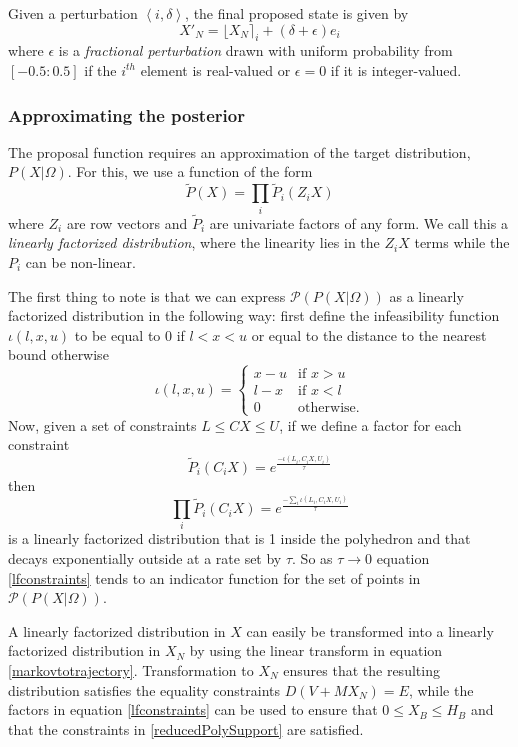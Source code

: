 \documentclass{article}
\begin{document}
Given a perturbation $\left<i,\delta\right>$, the final proposed state is given by
\[
X'_N = \lfloor X_N \rceil_i + (\delta + \epsilon)e_i
\]
where $\epsilon$ is a \textit{fractional perturbation} drawn with uniform probability from $[-0.5:0.5]$ if the $i^{th}$ element is real-valued or $\epsilon = 0$ if it is integer-valued.

\subsubsection{Approximating the posterior}
\label{approximatingThePosterior}
The proposal function requires an approximation of the target distribution, $P(X|\Omega)$. For this, we use a function of the form
\begin{equation}
\tilde{P}(X) = \prod_i \tilde{P}_i(Z_iX)
\end{equation}
where $Z_i$ are row vectors and $\tilde{P}_i$ are univariate factors of any form. We call this a \textit{linearly factorized distribution}, where the linearity lies in the $Z_iX$ terms while the $P_i$ can be non-linear.

The first thing to note is that we can express $\mathcal{P}(P(X|\Omega))$ as a linearly factorized distribution in the following way: first define the infeasibility function $\iota(l,x,u)$ to be equal to 0 if $l < x < u$ or equal to the distance to the nearest bound otherwise
\[
\iota(l,x,u) =
\begin{cases}
x-u & \text{if }x>u\\
l-x & \text{if }x<l\\
0 & \text{otherwise.}
\end{cases}
\]
Now, given a set of constraints $L \le CX \le U$, if we define a factor for each constraint
\begin{equation}
\tilde{P}_i(C_iX) = e^{\frac{-\iota(L_i,C_iX,U_i)}{\tau}}
\end{equation}
then
\begin{equation}
\prod_i \tilde{P}_i(C_iX) = e^{\frac{-\sum_i \iota(L_i,C_iX,U_i)}{\tau}}
\label{lfconstraints}
\end{equation}
is a linearly factorized distribution that is 1 inside the polyhedron and that decays exponentially outside at a rate set by $\tau$. So as $\tau \to 0$ equation \eqref{lfconstraints} tends to an indicator function for the set of points in $\mathcal{P}(P(X|\Omega))$.

A linearly factorized distribution in $X$ can easily be transformed into a linearly factorized distribution in $X_N$ by using the linear transform in equation \eqref{markovtotrajectory}. Transformation to $X_N$ ensures that the resulting distribution satisfies the equality constraints $D(V+MX_N)=E$, while the factors in equation \eqref{lfconstraints} can be used to ensure that $0 \le X_B \le H_B$ and that the constraints in \eqref{reducedPolySupport} are satisfied.
\end{document}
